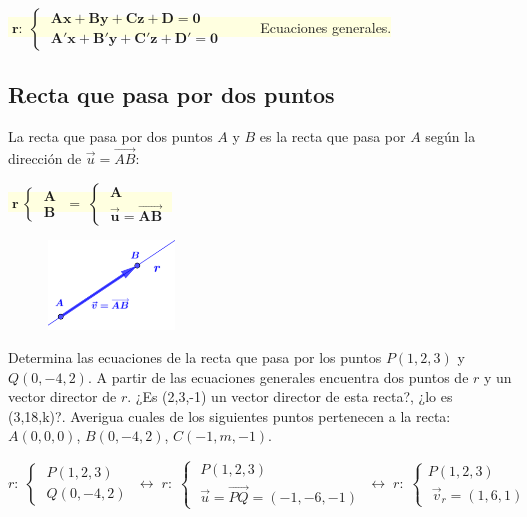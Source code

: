 \vspace{2mm} \colorbox{LightYellow}{$\; \boldsymbol{r:\;  \begin{cases} \;Ax+By+Cz+D=0\\ \;A'x+B'y+C'z+D'=0 \end{cases} }\;\qquad$ Ecuaciones generales.}

\subsection{Recta que pasa por dos puntos}

La recta que pasa por dos puntos $A$ y $B$ es la recta que pasa por $A$ según la dirección de $\vec u=\overrightarrow{AB}$:

\vspace{3mm} 
\begin{multicols}{2}
\centerline{\colorbox{LightYellow}{$\;\boldsymbol{ r\: \begin{cases} \; A \\ \; B  \end{cases}\; = \; \begin{cases} \; A \\\; \vec u=\overrightarrow{AB} \end{cases}\;}$}}

	\begin{figure}[H]
		\centering
		\includegraphics[width=0.3\textwidth]{imagenes/imagenes10/T10IM00R.png}
	\end{figure}
\end{multicols}

\vspace{3mm}
\begin{ejem}
	Determina las ecuaciones de la recta que pasa por los puntos $P(1,2,3)$ y $Q(0,-4,2)$.  A partir de las ecuaciones generales encuentra dos puntos de $r$ y un vector director de $r$. ¿Es (2,3,-1) un vector director de esta recta?, ¿lo es (3,18,k)?. Averigua cuales de los siguientes puntos pertenecen a la recta: $A(0,0,0)$, $B(0,-4,2)$, $C(-1,m,-1)$.
\end{ejem}

\noindent \small{$r:\; \begin{cases} \; P(1,2,3)\\ \; Q(0,-4,2) \end{cases} \; \leftrightarrow \; r:\; \begin{cases} \; P(1,2,3) \\ \; \vec u=\overrightarrow{PQ}=(-1,-6,-1) \end{cases} \; \leftrightarrow \; r:\; \begin{cases} P(1,2,3)\\ \; \vec v_r=(1,6,1) \end{cases}$}

